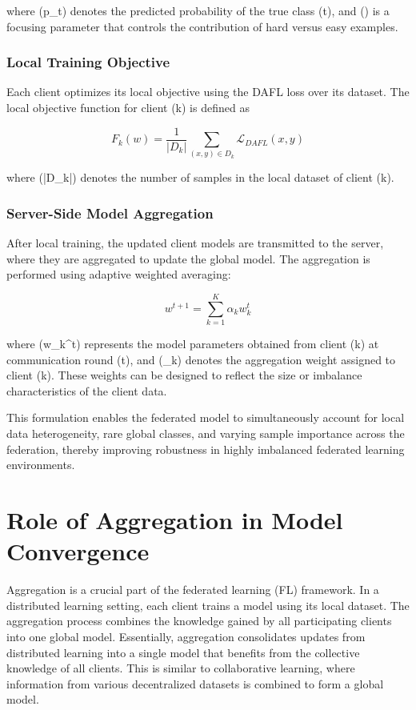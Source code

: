 \documentclass[12pt]{book}
\begin{document}
where (p_t) denotes the predicted probability of the true class (t), and (\gamma) is a focusing parameter that controls the contribution of hard versus easy examples.

\subsubsection{Local Training Objective}

Each client optimizes its local objective using the DAFL loss over its dataset. The local objective function for client (k) is defined as

\begin{equation}
F_k(w) =
\frac{1}{|D_k|}
\sum_{(x,y)\in D_k}
\mathcal{L}_{DAFL}(x,y)
\end{equation}

where (|D_k|) denotes the number of samples in the local dataset of client (k).

\subsubsection{Server-Side Model Aggregation}

After local training, the updated client models are transmitted to the server, where they are aggregated to update the global model. The aggregation is performed using adaptive weighted averaging:

\begin{equation}
w^{t+1} =
\sum_{k=1}^{K}
\alpha_k w_k^{t}
\end{equation}

where (w_k^{t}) represents the model parameters obtained from client (k) at communication round (t), and (\alpha_k) denotes the aggregation weight assigned to client (k). These weights can be designed to reflect the size or imbalance characteristics of the client data.

This formulation enables the federated model to simultaneously account for local data heterogeneity, rare global classes, and varying sample importance across the federation, thereby improving robustness in highly imbalanced federated learning environments.

\section{Role of Aggregation in Model Convergence}

Aggregation is a crucial part of the federated learning (FL) framework. In a distributed learning setting, each client trains a model using its local dataset. The aggregation process combines the knowledge gained by all participating clients into one global model. Essentially, aggregation consolidates updates from distributed learning into a single model that benefits from the collective knowledge of all clients. This is similar to collaborative learning, where information from various decentralized datasets is combined to form a global model.
\end{document}
